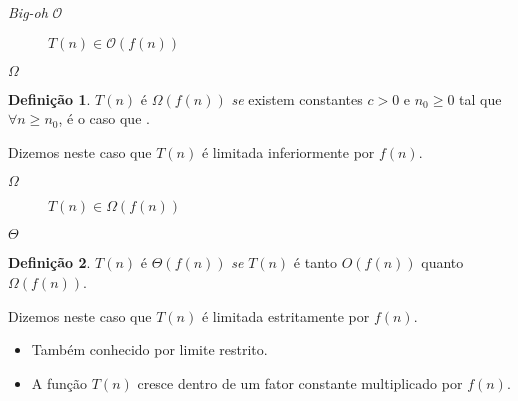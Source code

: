 \documentclass[
    mode=present,
    style=dvn,
    paper=screen,
    display=slidesnotes,
    size=14pt,
]{powerdot}
\theoremstyle{plain}
\theoremstyle{definition}
\newtheorem{defn}{Definição}
\theoremstyle{remark}
\begin{document}
\begin{slide}{\textit{Big-oh} $\mathcal{O}$}

    \begin{figure}
        
        \caption{$T(n){\in}\mathcal{O}(f(n))$}
    \end{figure}
\end{slide}

\begin{slide}{$\Omega$}
    \begin{defn}
         $T(n)$ é $\Omega(f(n))$ \textit{se} existem constantes $c>0$ e $n_0 \geq 0$ tal que $\forall n \geq n_0$, é o caso que .\pause
    \end{defn}
    Dizemos neste caso que $T(n)$ é limitada inferiormente por $f(n)$.
    \bigskip
{}
\end{slide}

\begin{slide}{$\Omega$}
    \begin{figure}
        
        \caption{$T(n){\in}\Omega(f(n))$}
    \end{figure}
\end{slide}


\begin{slide}{$\Theta$}
    \begin{defn}
         $T(n)$ é $\Theta(f(n))$ \textit{se} $T(n)$ é tanto $O(f(n))$ quanto $\Omega(f(n))$.\pause
    \end{defn}
    Dizemos neste caso que $T(n)$ é limitada estritamente por $f(n)$.\pause

    \begin{itemize}
        \item Também conhecido por limite restrito.
        \item A função $T(n)$ cresce dentro de um fator constante multiplicado por $f(n)$.
    \end{itemize}
\end{slide}
\end{document}
